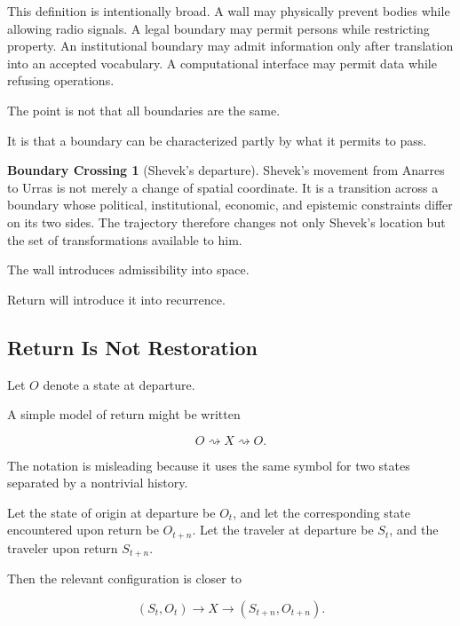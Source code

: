 \documentclass[
  11pt,
  a4paper,
  DIV=12,
  BCOR=0mm,
  parskip=half-
]{scrartcl}
\theoremstyle{definition}
\newtheorem{crossing}[definition]{Boundary Crossing}
\theoremstyle{plain}
\theoremstyle{remark}
\begin{document}
This definition is intentionally broad. A wall may physically prevent bodies
while allowing radio signals. A legal boundary may permit persons while
restricting property. An institutional boundary may admit information only
after translation into an accepted vocabulary. A computational interface may
permit data while refusing operations.

The point is not that all boundaries are the same.

It is that a boundary can be characterized partly by what it permits to pass.

\begin{crossing}[Shevek's departure]
\label{cross:shevek-departure}
Shevek's movement from Anarres to Urras is not merely a change of spatial
coordinate. It is a transition across a boundary whose political,
institutional, economic, and epistemic constraints differ on its two sides.
The trajectory therefore changes not only Shevek's location but the set of
transformations available to him.
\end{crossing}

The wall introduces admissibility into space.

Return will introduce it into recurrence.


\subsection{Return Is Not Restoration}
\label{sec:return-not-restoration}

Let \(O\) denote a state at departure.

A simple model of return might be written

\[
  O
  \rightsquigarrow
  X
  \rightsquigarrow
  O.
\]

The notation is misleading because it uses the same symbol for two states
separated by a nontrivial history.

Let the state of origin at departure be \(O_t\), and let the corresponding
state encountered upon return be \(O_{t+n}\). Let the traveler at departure be
\(S_t\), and the traveler upon return \(S_{t+n}\).

Then the relevant configuration is closer to

\[
  (S_t,O_t)
  \longrightarrow
  X
  \longrightarrow
  (S_{t+n},O_{t+n}).
\]
\end{document}
